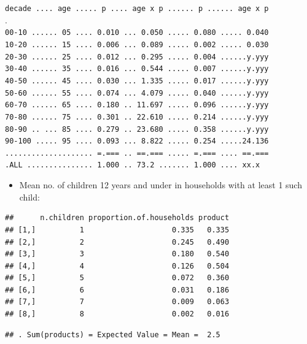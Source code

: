 \documentclass[]{book}
\providecommand{\tightlist}{%
  \setlength{\itemsep}{0pt}\setlength{\parskip}{0pt}}
\begin{document}
\texttt{decade\ ....\ age\ .....\ p\ ....\ age\ x\ p\ ......\ p\ ......\ age\ x\ p}~\\
.\\
\texttt{00-10\ ......\ 05\ ....\ 0.010\ ...\ 0.050\ .....\ 0.080\ .....\ 0.040}~\\
\texttt{10-20\ ......\ 15\ ....\ 0.006\ ...\ 0.089\ .....\ 0.002\ .....\ 0.030}~\\
\texttt{20-30\ ......\ 25\ ....\ 0.012\ ...\ 0.295\ .....\ 0.004\ ......y.yyy}~\\
\texttt{30-40\ ......\ 35\ ....\ 0.016\ ...\ 0.544\ .....\ 0.007\ ......y.yyy}~\\
\texttt{40-50\ ......\ 45\ ....\ 0.030\ ...\ 1.335\ .....\ 0.017\ ......y.yyy}~\\
\texttt{50-60\ ......\ 55\ ....\ 0.074\ ...\ 4.079\ .....\ 0.040\ ......y.yyy}~\\
\texttt{60-70\ ......\ 65\ ....\ 0.180\ ..\ 11.697\ .....\ 0.096\ ......y.yyy}~\\
\texttt{70-80\ ......\ 75\ ....\ 0.301\ ..\ 22.610\ .....\ 0.214\ ......y.yyy}~\\
\texttt{80-90\ ..\ ...\ 85\ ....\ 0.279\ ..\ 23.680\ .....\ 0.358\ ......y.yyy}~\\
\texttt{90-100\ .....\ 95\ ....\ 0.093\ ...\ 8.822\ .....\ 0.254\ .....24.136}~\\
\texttt{....................\ =.===\ ..\ ==.===\ .....\ =.===\ ....\ ==.===}~\\
\texttt{.ALL\ ...............\ 1.000\ ..\ 73.2\ .......\ 1.000\ ....\ xx.x}

\begin{itemize}
\tightlist
\item
  Mean no. of children 12 years and under in households with at least 1 such child:
\end{itemize}

\begin{verbatim}
##      n.children proportion.of.households product
## [1,]          1                    0.335   0.335
## [2,]          2                    0.245   0.490
## [3,]          3                    0.180   0.540
## [4,]          4                    0.126   0.504
## [5,]          5                    0.072   0.360
## [6,]          6                    0.031   0.186
## [7,]          7                    0.009   0.063
## [8,]          8                    0.002   0.016
\end{verbatim}

\begin{verbatim}
## . Sum(products) = Expected Value = Mean =  2.5
\end{verbatim}
\end{document}
